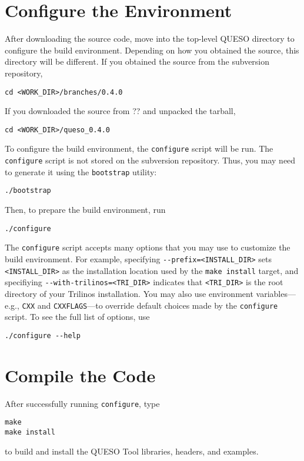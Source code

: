 \section{Configure the Environment} \label{section:configure}
After downloading the source code, move into the top-level QUESO
directory to configure the build environment.  Depending on how you
obtained the source, this directory will be different.  If you
obtained the source from the subversion repository,
%
\begin{verbatim}
cd <WORK_DIR>/branches/0.4.0
\end{verbatim}
%
If you downloaded the source from ?? and unpacked the tarball,
%
\begin{verbatim}
cd <WORK_DIR>/queso_0.4.0
\end{verbatim}
%

To configure the build environment, the \verb+configure+ script will
be run.  The \verb+configure+ script is not stored on the subversion
repository.  Thus, you may need to generate it using the
\verb+bootstrap+ utility:
%
\begin{verbatim}
./bootstrap
\end{verbatim}
%
Then, to prepare the build environment, run
%
\begin{verbatim}
./configure
\end{verbatim}
%
The \verb+configure+ script accepts many options that you may use to
customize the build environment.  For example, specifying
\verb+--prefix=<INSTALL_DIR>+ sets \verb+<INSTALL_DIR>+ as the
installation location used by the \verb+make install+ target, and
specifiying \verb+--with-trilinos=<TRI_DIR>+ indicates that
\verb+<TRI_DIR>+ is the root directory of your Trilinos installation.
You may also use environment variables---e.g., \verb+CXX+ and
\verb+CXXFLAGS+---to override default choices made by the
\verb+configure+ script.  To see the full list of options, use
%
\begin{verbatim}
./configure --help
\end{verbatim}
%

\section{Compile the Code} \label{section:compile}
After successfully running \verb+configure+, type
%
\begin{verbatim}
make
make install
\end{verbatim}
%
to build and install the QUESO Tool libraries, headers, and examples.
